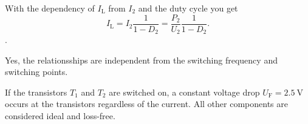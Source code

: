 \begin{solutionblock}
    With the dependency of $I_\mathrm{L}$ from $I_\mathrm{2}$ and the duty cycle you get
    \begin{equation}
        I_\mathrm{L}=I_\mathrm{2} \frac{1}{1-D_2}= \frac{P_\mathrm{2}}{U_\mathrm{2}} \frac{1}{1-D_2}.
    \end{equation}.
\end{solutionblock}


\begin{solutionblock}
    Yes, the relationsships are independent from the switching frequency and switching points.
\end{solutionblock}

\vspace{2em}\par
If the transistors $T_1$ and $T_2$ are switched on, a constant voltage drop $U_\mathrm{F}=\SI{2.5}{\volt}$ occurs at the transistors
 regardless of the current. All other components are considered ideal and loss-free.

